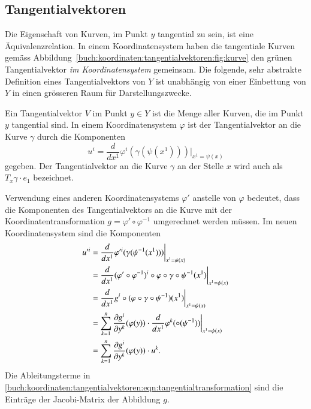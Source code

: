 %
%
\subsection{Tangentialvektoren}
Die Eigenschaft von Kurven, im Punkt $y$ tangential zu sein, ist
eine Äquivalenzrelation.
In einem Koordinatensystem haben die tangentiale Kurven gemäss
Abbildung~\ref{buch:koordinaten:tangentialvektoren:fig:kurve}
den grünen Tangentialvektor \emph{im Koordinatensystem} gemeinsam.
Die folgende, sehr abstrakte Definition eines Tangentialvektors
von $Y$ ist unabhängig von einer Einbettung von $Y$ in einen
grösseren Raum für Darstellungszwecke.

\begin{definition}[Tangentialvektor]
\label{buch:koordinaten:tangentialvektoren:def:tangentialvektor}
%
Ein Tangentialvektor $V$ im Punkt $y\in Y$ ist die Menge aller Kurven, die
im Punkt $y$ tangential sind.
In einem Koordinatensystem $\varphi$ ist der Tangentialvektor an die Kurve
$\gamma$ durch die Komponenten
\[
u^i
=
\frac{d}{dx^1} \varphi^i(\gamma(\psi(x^1))) \bigg|_{x^1 = \psi(x)}
\]
gegeben.
Der Tangentialvektor an die Kurve $\gamma$ an der Stelle $x$
wird auch als $T_x\gamma\cdot e_1$ bezeichnet.
\end{definition}

Verwendung eines anderen Koordinatensystems $\varphi'$ anstelle von
$\varphi$ bedeutet, dass die Komponenten des Tangentialvektors
an die Kurve mit der Koordinatentransformation
$g=\varphi'\circ\varphi^{-1}$ umgerechnet werden müssen.
Im neuen Koordinatensystem sind die Komponenten
\begin{align}
u^{\prime i}
&=
\frac{d}{dx^1}
\varphi^{\prime i}(\gamma(\psi^{-1}(x^1))) \bigg|_{x^1=\psi(x)}
\notag
\\
&=
\frac{d}{dx^1}
(\varphi'\circ\varphi^{-1})^i\circ \varphi\circ\gamma\circ\psi^{-1}(x^1)
\bigg|_{x^1=\psi(x)}
\notag
\\
&=
\frac{d}{dx^1} g^i\circ(\varphi\circ\gamma\circ\psi^{-1})(x^1)
\bigg|_{x^1=\psi(x)}
\notag
\\
&=
\sum_{k=1}^n
\frac{\partial g^i}{\partial y^k}(\varphi(y))
\cdot
\frac{d}{dx^1}\varphi^k(\circ(\psi^{-1})) 
\bigg|_{x^1=\psi(x)}
\notag
\\
&=
\sum_{k=1}^n
\frac{\partial g^i}{\partial y^k}(\varphi(y))
\cdot
u^k.
\label{buch:koordinaten:tangentialvektoren:eqn:tangentialtransformation}
\end{align}
Die Ableitungsterme in
\eqref{buch:koordinaten:tangentialvektoren:eqn:tangentialtransformation}
sind die Einträge der Jacobi-Matrix der Abbildung $g$.
%

